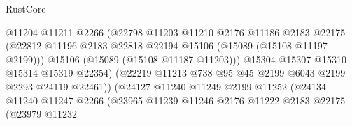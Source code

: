\begin{lexlean}{RustCore}
\begin{coremodule}
                                        @11204
                                        @11211
                                        @2266
                                        (@22798
                                          @11203
                                          @11210
                                          @2176
                                          @11186
                                          @2183
                                          @22175
                                          (@22812
                                            @11196
                                            @2183
                                            @22818
                                            @22194
                                            @15106
                                            (@15089 (@15108 @11197 @2199)))
                                          @15106
                                          (@15089 (@15108 @11187 @11203)))
                                        @15304
                                        @15307
                                        @15310
                                        @15314
                                        @15319
                                        @22354)
                                      (@22219
                                        @11213
                                        @738
                                        @95
                                        @45
                                        @2199
                                        @6043
                                        @2199
                                        @2293
                                        @24119
                                        @22461))
                                    (@24127
                                      @11240
                                      @11249
                                      @2199
                                      @11252
                                      (@24134
                                        @11240
                                        @11247
                                        @2266
                                        (@23965
                                          @11239
                                          @11246
                                          @2176
                                          @11222
                                          @2183
                                          @22175
                                          (@23979
                                            @11232

\end{coremodule}
\end{lexlean}
